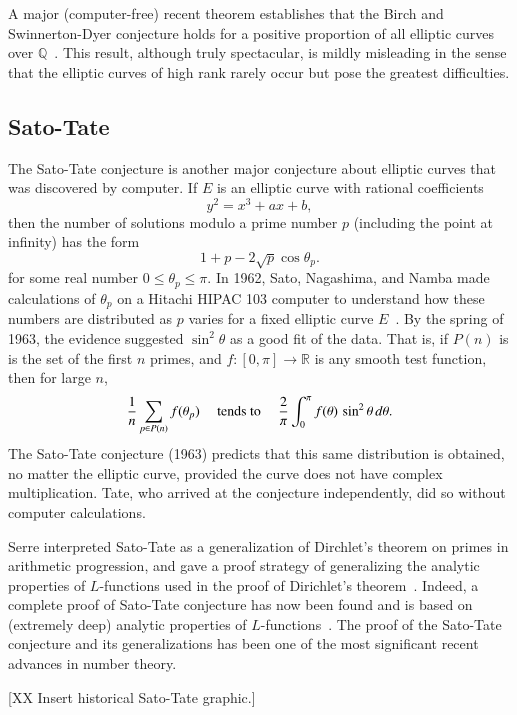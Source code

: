\documentclass{llncs}
\newcommand{\ring}[1]{\mathbb{#1}}
\begin{document}
A major (computer-free) recent theorem establishes that the Birch and Swinnerton-Dyer
conjecture holds for a positive proportion of all elliptic curves over
$\ring{Q}$~\cite{BS:2010}.  This result, although truly spectacular, is
mildly misleading in the sense that the elliptic curves of high rank rarely
occur but pose the greatest difficulties.





\subsection{Sato-Tate}


The Sato-Tate conjecture is another major conjecture about elliptic
curves that was discovered by computer.  If $E$ is an elliptic curve
with rational coefficients
\[
y^2 = x^3 + a x + b,
\]
then the number of solutions modulo a prime number $p$ (including the
point at infinity) has the form
\[
1 + p - 2\sqrt{p}\cos\theta_p.
\]
for some real number $0\le \theta_p\le \pi$.  In 1962, Sato,
Nagashima, and Namba made calculations  of $\theta_p$ on a Hitachi
HIPAC 103 computer to understand how these numbers are distributed as
$p$ varies for a fixed elliptic curve $E$~\cite{Sch}.  By the spring of 1963, the
evidence suggested  $\sin^2\theta$ as a good fit of the data.
That is, if $P(n)$ is is the set of the first $n$ primes, and
$f:[0,\pi]\to\ring{R}$ is any smooth test function, then for large
$n$,
\[
\frac{1}{n}\sum_{p\in P(n)} f(\theta_p) \quad\hbox{ tends to }\quad
\frac{2}{\pi}\int_0^\pi f(\theta)\,\sin^2\theta\,d\theta.
\]
The Sato-Tate conjecture (1963) predicts that this same distribution is
obtained, no matter the elliptic curve, provided the curve does not
have complex multiplication.  Tate, who arrived at the conjecture
independently, did so without computer calculations.

Serre interpreted Sato-Tate as a generalization of Dirchlet's
theorem on primes in arithmetic progression, and gave a proof strategy
of generalizing the analytic properties of $L$-functions used in
the proof of Dirichlet's theorem~\cite{Se68}.  Indeed, a complete proof of Sato-Tate
conjecture has now been found and is based on (extremely deep)
analytic properties of $L$-functions~\cite{Car:Bourbaki}.
The proof of the Sato-Tate conjecture and its generalizations has been
one of the most significant recent advances in number theory.

[XX Insert historical Sato-Tate graphic.]
\end{document}
